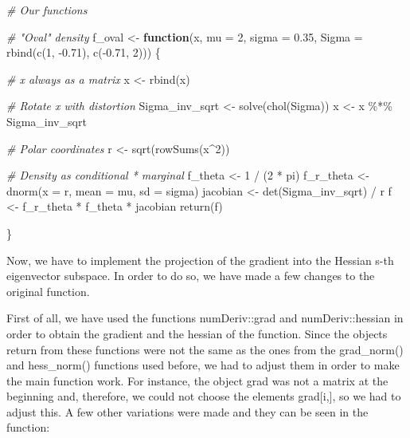 \documentclass[
]{article}
\newenvironment{Shaded}{\begin{snugshade}}{\end{snugshade}}
\newcommand{\AttributeTok}[1]{\textcolor[rgb]{0.77,0.63,0.00}{#1}}
\newcommand{\CommentTok}[1]{\textcolor[rgb]{0.56,0.35,0.01}{\textit{#1}}}
\newcommand{\ControlFlowTok}[1]{\textcolor[rgb]{0.13,0.29,0.53}{\textbf{#1}}}
\newcommand{\DecValTok}[1]{\textcolor[rgb]{0.00,0.00,0.81}{#1}}
\newcommand{\FloatTok}[1]{\textcolor[rgb]{0.00,0.00,0.81}{#1}}
\newcommand{\FunctionTok}[1]{\textcolor[rgb]{0.00,0.00,0.00}{#1}}
\newcommand{\NormalTok}[1]{#1}
\newcommand{\OtherTok}[1]{\textcolor[rgb]{0.56,0.35,0.01}{#1}}
\newcommand{\SpecialCharTok}[1]{\textcolor[rgb]{0.00,0.00,0.00}{#1}}
\begin{document}
\begin{Shaded}
\begin{Highlighting}[]
\CommentTok{\# Our functions }

\CommentTok{\# "Oval" density}
\NormalTok{f\_oval }\OtherTok{\textless{}{-}} \ControlFlowTok{function}\NormalTok{(x, }\AttributeTok{mu =} \DecValTok{2}\NormalTok{, }\AttributeTok{sigma =} \FloatTok{0.35}\NormalTok{, }
                   \AttributeTok{Sigma =} \FunctionTok{rbind}\NormalTok{(}\FunctionTok{c}\NormalTok{(}\DecValTok{1}\NormalTok{, }\SpecialCharTok{{-}}\FloatTok{0.71}\NormalTok{), }\FunctionTok{c}\NormalTok{(}\SpecialCharTok{{-}}\FloatTok{0.71}\NormalTok{, }\DecValTok{2}\NormalTok{))) \{}
  
  \CommentTok{\# x always as a matrix}
\NormalTok{  x }\OtherTok{\textless{}{-}} \FunctionTok{rbind}\NormalTok{(x)}
  
  \CommentTok{\# Rotate x with distortion}
\NormalTok{  Sigma\_inv\_sqrt }\OtherTok{\textless{}{-}} \FunctionTok{solve}\NormalTok{(}\FunctionTok{chol}\NormalTok{(Sigma))}
\NormalTok{  x }\OtherTok{\textless{}{-}}\NormalTok{ x }\SpecialCharTok{\%*\%}\NormalTok{ Sigma\_inv\_sqrt}
  
  \CommentTok{\# Polar coordinates}
\NormalTok{  r }\OtherTok{\textless{}{-}} \FunctionTok{sqrt}\NormalTok{(}\FunctionTok{rowSums}\NormalTok{(x}\SpecialCharTok{\^{}}\DecValTok{2}\NormalTok{))}
  
  \CommentTok{\# Density as conditional * marginal}
\NormalTok{  f\_theta }\OtherTok{\textless{}{-}} \DecValTok{1} \SpecialCharTok{/}\NormalTok{ (}\DecValTok{2} \SpecialCharTok{*}\NormalTok{ pi)}
\NormalTok{  f\_r\_theta }\OtherTok{\textless{}{-}} \FunctionTok{dnorm}\NormalTok{(}\AttributeTok{x =}\NormalTok{ r, }\AttributeTok{mean =}\NormalTok{ mu, }\AttributeTok{sd =}\NormalTok{ sigma)}
\NormalTok{  jacobian }\OtherTok{\textless{}{-}}  \FunctionTok{det}\NormalTok{(Sigma\_inv\_sqrt) }\SpecialCharTok{/}\NormalTok{ r}
\NormalTok{  f }\OtherTok{\textless{}{-}}\NormalTok{ f\_r\_theta }\SpecialCharTok{*}\NormalTok{ f\_theta }\SpecialCharTok{*}\NormalTok{ jacobian}
  \FunctionTok{return}\NormalTok{(f)}
  
\NormalTok{\}}
\end{Highlighting}
\end{Shaded}

Now, we have to implement the projection of the gradient into the
Hessian s-th eigenvector subspace. In order to do so, we have made a few
changes to the original function.

First of all, we have used the functions numDeriv::grad and
numDeriv::hessian in order to obtain the gradient and the hessian of the
function. Since the objects return from these functions were not the
same as the ones from the grad\_norm() and hess\_norm() functions used
before, we had to adjust them in order to make the main function work.
For instance, the object grad was not a matrix at the beginning and,
therefore, we could not choose the elements grad{[}i,{]}, so we had to
adjust this. A few other variations were made and they can be seen in
the function:
\end{document}

